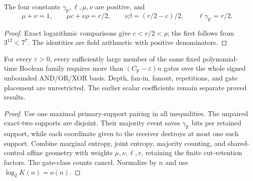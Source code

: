 \begin{lemma}
  \label{lem:lowerbounds-algebraic-geometry-fiber-weights}
  \leanok
  The four constants $\gamma_{\mathrm F},\ell,\mu,\nu$ are positive, and
  \[
    \mu+\nu=1,\qquad \mu c+\nu\rho=r/2,\qquad
    \nu\beta=(r/2-c)/2,\qquad \ell\gamma_{\mathrm F}=r/2.
  \]
\end{lemma}
\begin{proof}
  \leanok
  Exact logarithmic comparisons give $c<r/2<\rho$; the first follows from
  $3^{12}<7^7$. The identities are field arithmetic with positive denominators.
\end{proof}

\begin{theorem}
  \label{thm:lowerbounds-algebraic-geometry-fiber-explicit}
  \leanok
  For every $\varepsilon>0$, every sufficiently large member of the same fixed
  polynomial-time Boolean family requires more than
  $(C_{\mathrm F}-\varepsilon)n$ gates over the whole signed unbounded
  AND/OR/XOR basis. Depth, fan-in, fanout, repetitions, and gate placement are
  unrestricted. The earlier scalar coefficients remain separate proved results.
\end{theorem}
\begin{proof}
  \leanok
  Use one maximal primary-support pairing in all inequalities. The unpaired
  exact-two supports are disjoint. Their majority event saves
  $\gamma_{\mathrm F}$ bits per retained support, while each coordinate given
  to the receiver destroys at most one such support. Combine marginal entropy,
  joint entropy, majority counting, and shared-control affine geometry with
  weights $\mu,\nu,\ell,r$, retaining the finite cut-retention factors. The
  gate-class counts cancel. Normalize by $n$ and use $\log_2K(n)=o(n)$.
\end{proof}

